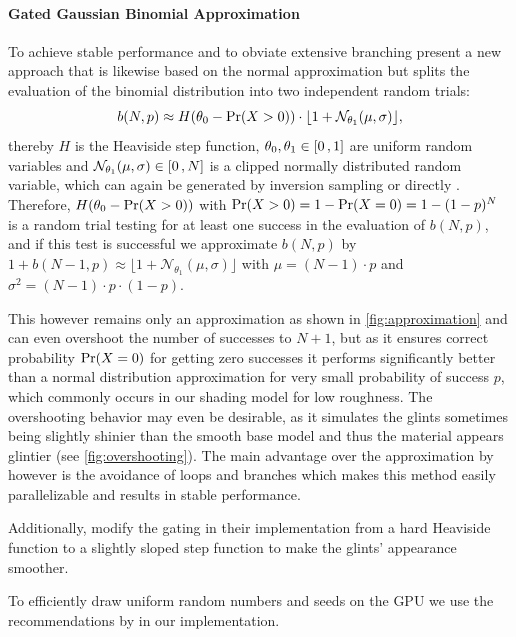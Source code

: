 \paragraph{Gated Gaussian Binomial Approximation}
%
To achieve stable performance and to obviate extensive branching \textcite{deliot2023} present a new approach that is likewise based on the normal approximation but splits the evaluation of the binomial distribution into two independent random trials:
%
\begin{equation}
    b(N,p) \approx H(\theta_0 - \mathrm{Pr}(X>0)) \cdot \lfloor 1 + \mathcal{N}_{\theta_1}(\mu, \sigma)\rfloor,
\end{equation}
%
thereby $H$ is the Heaviside step function, $\theta_0, \theta_1 \in [ 0 \,, 1 ]$ are uniform random variables and $\mathcal{N}_{\theta_1}(\mu, \sigma) \in [ 0 \,, N ]$ is a clipped normally distributed random variable, which can again be generated by inversion sampling \parencite[e.g.,][]{giles2012} or directly \parencite[e.g.,][]{box1958}.
%
Therefore, $H(\theta_0 - \mathrm{Pr}(X>0))$ with $\mathrm{Pr}(X>0)=1-\mathrm{Pr}(X=0)=1-(1-p)^N$ is a random trial testing for at least one success in the evaluation of $b(N,p)$, and if this test is successful we approximate $b(N,p)$ by $1+b(N-1,p) \approx \lfloor 1 + \mathcal{N}_{\theta_1}(\mu, \sigma) \rfloor$ with $\mu=(N-1) \cdot p$ and $\sigma^2=(N-1) \cdot p \cdot (1-p)$.
%

This however remains only an approximation as shown in \cref{fig:approximation} and can even overshoot the number of successes to $N+1$, but as it ensures correct probability $\mathrm{Pr}(X=0)$ for getting zero successes it performs significantly better than a normal distribution approximation for very small probability of success $p$, which commonly occurs in our shading model for low roughness.
%
The overshooting behavior may even be desirable, as it simulates the glints sometimes being slightly shinier than the smooth base model and thus the material appears glintier (see \cref{fig:overshooting}).
%
The main advantage over the approximation by \textcite{zirr2016} however is the avoidance of loops and branches which makes this method easily parallelizable and results in stable performance.

Additionally, \textcite{deliot2023} modify the gating in their implementation from a hard Heaviside function to a slightly sloped step function to make the glints' appearance smoother.

To efficiently draw uniform random numbers and seeds on the GPU we use the recommendations by \textcite{jarzynski2020} in our implementation.